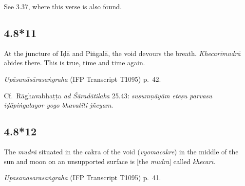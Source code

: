 \begin{ekdosis}


\begin{philcomm}[hp04_008_10]
See 3.37, where this verse is also found.
\end{philcomm}

\subsection*{4.8*11}
\begin{translation}[hp04_008_11]
At the juncture of Iḍā and Piṅgalā, the void devours the breath. \emph{Khecarīmudrā} abides there. This is true, time and time again.
\end{translation}


\begin{testimonia}[hp04_008_11]
\emph{Upāsanāsārasaṅgraha} (IFP Transcript T1095) p.~42.
\begin{versinnote}
\end{versinnote}
\end{testimonia}

\begin{philcomm}[hp04_008_11]
Cf.~Rāghavabhaṭṭa \emph{ad Śāradātilaka} 25.43: \emph{suṣumṇāyām eteṣu parvasu iḍāpiṅgalayor yogo bhavatīti jñeyam}.
\end{philcomm}

\subsection*{4.8*12}
\begin{translation}[hp04_008_12]
The \emph{mudrā} situated in the cakra of the void (\emph{vyomacakre}) in the middle of the sun and moon on an unsupported surface is [the \emph{mudrā}] called \emph{khecarī}.
\end{translation}


\begin{testimonia}[hp04_008_12]
\emph{Upāsanāsārasaṅgraha} (IFP Transcript T1095) p.~41.
\begin{versinnote}
\end{versinnote}


\end{testimonia}
\end{ekdosis}
